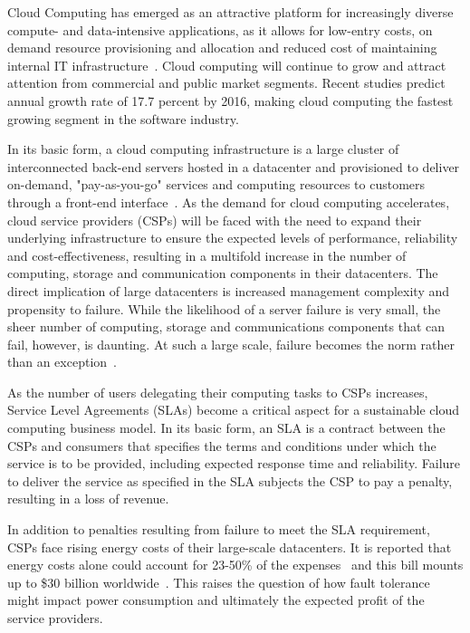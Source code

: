 \noindent 
Cloud Computing has emerged as an attractive platform for increasingly
diverse compute- and data-intensive applications, as it allows for
low-entry costs, on demand resource provisioning and allocation and
reduced cost of maintaining internal IT
infrastructure~\cite{tchana_cits_2012}. Cloud computing will continue
to grow and attract attention from commercial and public market
segments. Recent studies predict annual growth rate of 17.7 percent by
2016, making cloud computing the fastest growing segment in the
software industry.

In its basic form, a cloud computing infrastructure is a large cluster
of interconnected back-end servers hosted in a datacenter and
provisioned to deliver on-demand, "pay-as-you-go" services and
computing resources to customers through a front-end
interface~\cite{ec2_site}. As the demand for cloud computing
accelerates, cloud service providers (CSPs) will be faced with the
need to expand their underlying infrastructure to ensure the expected
levels of performance, reliability and cost-effectiveness, resulting
in a multifold increase in the number of computing, storage and
communication components in their datacenters. The direct implication of large datacenters is increased management complexity and propensity to
failure. While the likelihood of a server failure is very small, the
sheer number of computing, storage and communications components that
can fail, however, is daunting. At such a large scale, failure becomes
the norm rather than an exception~\cite{schroeder_2010_dsc}.

As the number of users delegating their computing tasks to CSPs
increases, Service Level Agreements (SLAs) become a critical aspect
for a sustainable cloud computing business model. In its basic form,
an SLA is a contract between the CSPs and consumers that specifies the
terms and conditions under which the service is to be provided,
including expected response time and reliability. Failure to deliver
the service as specified in the SLA subjects the CSP to pay a penalty,
resulting in a loss of revenue.

In addition to penalties resulting from failure to meet the SLA
requirement, CSPs face rising energy costs of their large-scale
datacenters.  It is reported that energy costs alone could account
for 23-50\% of the expenses~\cite{Elnozahy03energyconservation} and
this bill mounts up to \$30 billion
worldwide~\cite{Raghavendra:2008:NPS}. This raises the question of how
fault tolerance might impact power consumption and ultimately the
expected profit of the service providers.

